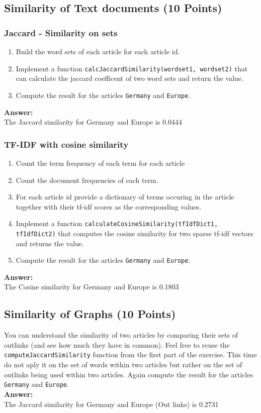 \documentclass{WeSTassignment}
\begin{document}
\subsection{Similarity of Text documents  (10 Points)}
\subsubsection{Jaccard - Similarity on sets}
\begin{enumerate}
\item Build the word sets of each article for each article id.
\item Implement a function \texttt{calcJaccardSimilarity(wordset1, wordset2)} that can calculate the jaccard coefficent of two word sets and return the value.
\item Compute the result for the articles \texttt{Germany} and \texttt{Europe}.\\
\end{enumerate}
\textbf{Answer:}\\
The Jaccard similarity for Germany and Europe is 0.0444

\subsubsection{TF-IDF with cosine similarity}
\begin{enumerate}
\item Count the term frequency of each term for each article
\item Count the document frequencies of each term. 
\item For each article id provide a dictionary of terms occuring in the article together with their tf-idf scores as the corresponding values.
\item Implement a function \texttt{calculateCosineSimilarity(tfIdfDict1, tfIdfDict2)} that computes the cosine similarity for two sparse tf-idf vectors and returns the value.
\item Compute the result for the articles \texttt{Germany} and \texttt{Europe}.\\
\end{enumerate}
\textbf{Answer:}\\
The Cosine similarity for Germany and Europe is 0.1803
\subsection{Similarity of Graphs (10 Points)}
You can understand the similarity of two articles by comparing their sets of outlinks (and see how much they have in common). Feel free to reuse the \texttt{computeJaccardSimilarity} function from the first part of the exercise. This time do not aply it on the set of words within two articles but rather on the set of outlinks being used within two articles. Again compute the result for the articles \texttt{Germany} and \texttt{Europe}.\\
\textbf{Answer:}\\
The Jaccard similarity for Germany and Europe (Out links) is 0.2731
\end{document}
